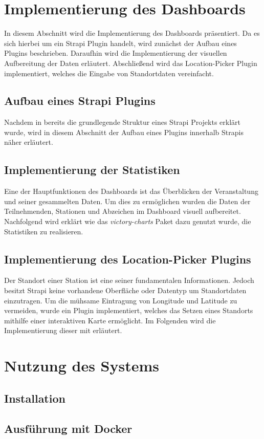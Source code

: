 \section{Implementierung des Dashboards} \label{sec:impl-dashboard}

In diesem Abschnitt wird die Implementierung des Dashboards präsentiert. Da es
sich hierbei um ein Strapi Plugin handelt, wird zunächst der Aufbau eines
Plugins beschrieben. Daraufhin wird die Implementierung der visuellen
Aufbereitung der Daten erläutert. Abschließend wird das Location-Picker Plugin
implementiert, welches die Eingabe von Standortdaten vereinfacht.

\subsection{Aufbau eines Strapi Plugins}

Nachdem in  bereits die grundlegende
Struktur eines Strapi Projekts erklärt wurde, wird in diesem Abschnitt der
Aufbau eines Plugins innerhalb Strapis näher erläutert.

\subsection{Implementierung der Statistiken}

Eine der Hauptfunktionen des Dashboards ist das Überblicken der Veranstaltung
und seiner gesammelten Daten. Um dies zu ermöglichen wurden die Daten der
Teilnehmenden, Stationen und Abzeichen im Dashboard visuell aufbereitet.
Nachfolgend wird erklärt wie das \textit{victory-charts} Paket dazu genutzt
wurde, die Statistiken zu realisieren.

\subsection{Implementierung des Location-Picker Plugins}

Der Standort einer Station ist eine seiner fundamentalen Informationen. Jedoch
besitzt Strapi keine vorhandene Oberfläche oder Datentyp um Standortdaten
einzutragen. Um die mühsame Eintragung von Longitude und Latitude zu vermeiden,
wurde ein Plugin implementiert, welches das Setzen eines Standorts mithilfe
einer interaktiven Karte ermöglicht. Im Folgenden wird die Implementierung
dieser mit erläutert.

\section{Nutzung des Systems}

\subsection{Installation}

\subsection{Ausführung mit Docker}